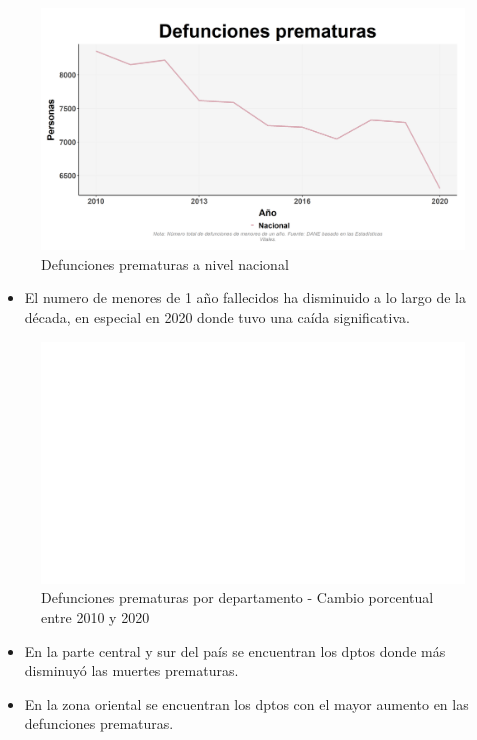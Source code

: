     \begin{figure}[H]
        \caption{Defunciones prematuras a nivel nacional \label{map_result_2} }
        \begin{center}
        \includegraphics[width=\textwidth,keepaspectratio]{img/var_281_trend.png}
        \end{center}
    \end{figure}
            \begin{itemize}
                \item El numero de menores de 1 año fallecidos ha disminuido a lo largo de la década, en especial en 2020 donde tuvo una caída significativa.
                \end{itemize}

    \begin{figure}[H]
        \caption{Defunciones prematuras por departamento - Cambio porcentual entre 2010 y 2020 \label{map_result_2} }
        \begin{center}
        \includegraphics[width=\textwidth,keepaspectratio]{img/var_280_map_change.png}
        \end{center}
    \end{figure}
            \begin{itemize}
                \item En la parte central y sur del país se encuentran los dptos donde más disminuyó las muertes prematuras.
                \item En la zona oriental se encuentran los dptos con el mayor aumento en las defunciones prematuras.
                \end{itemize}
